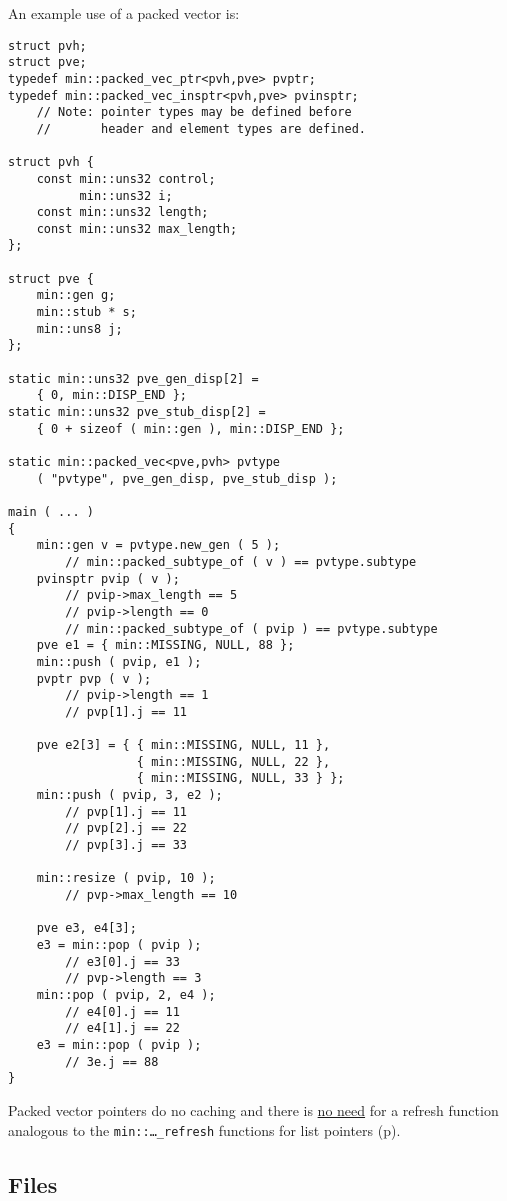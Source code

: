 \documentclass[12pt]{article}
\newcommand{\pagref}[1]{p\pageref{#1}}
\newcommand{\EOL}{\penalty \exhyphenpenalty}
\newenvironment{indpar}[1][0.3in]%
	{\begin{list}{}%
		     {\setlength{\itemsep}{0in}%
		      \setlength{\topsep}{0in}%
		      \setlength{\parsep}{1ex}%
		      \setlength{\labelwidth}{#1}%
		      \setlength{\leftmargin}{#1}%
		      \addtolength{\leftmargin}{\labelsep}}%
	 \item}%
	{\end{list}}
\begin{document}
An example use of a packed vector is:
\begin{indpar}\begin{verbatim}
struct pvh;
struct pve;
typedef min::packed_vec_ptr<pvh,pve> pvptr;
typedef min::packed_vec_insptr<pvh,pve> pvinsptr;
    // Note: pointer types may be defined before
    //       header and element types are defined.

struct pvh {
    const min::uns32 control;
          min::uns32 i;
    const min::uns32 length;
    const min::uns32 max_length;
};

struct pve {
    min::gen g;
    min::stub * s;
    min::uns8 j;
};

static min::uns32 pve_gen_disp[2] =
    { 0, min::DISP_END };
static min::uns32 pve_stub_disp[2] =
    { 0 + sizeof ( min::gen ), min::DISP_END };

static min::packed_vec<pve,pvh> pvtype
    ( "pvtype", pve_gen_disp, pve_stub_disp );

main ( ... )
{
    min::gen v = pvtype.new_gen ( 5 );
        // min::packed_subtype_of ( v ) == pvtype.subtype
    pvinsptr pvip ( v );
        // pvip->max_length == 5
        // pvip->length == 0
        // min::packed_subtype_of ( pvip ) == pvtype.subtype
    pve e1 = { min::MISSING, NULL, 88 };
    min::push ( pvip, e1 );
    pvptr pvp ( v );
        // pvip->length == 1
        // pvp[1].j == 11

    pve e2[3] = { { min::MISSING, NULL, 11 },
                  { min::MISSING, NULL, 22 },
                  { min::MISSING, NULL, 33 } };
    min::push ( pvip, 3, e2 );
        // pvp[1].j == 11
        // pvp[2].j == 22
        // pvp[3].j == 33

    min::resize ( pvip, 10 );
        // pvp->max_length == 10

    pve e3, e4[3];
    e3 = min::pop ( pvip );
        // e3[0].j == 33
        // pvp->length == 3
    min::pop ( pvip, 2, e4 );
        // e4[0].j == 11
        // e4[1].j == 22
    e3 = min::pop ( pvip );
        // 3e.j == 88
}
\end{verbatim}\end{indpar}

Packed vector pointers do no caching and
there is \underline{no need} for
a refresh function analogous to the {\tt min::\EOL \ldots\_\EOL refresh}
functions for list pointers (\pagref{LIST-POINTER-CACHE}).




\subsection{Files}
\label{FILES}
\end{document}
